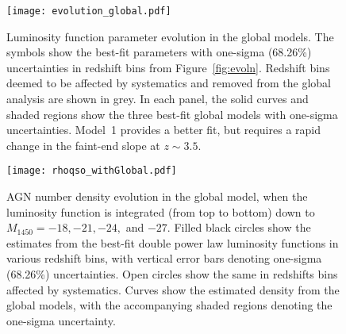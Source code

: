 \documentclass[fleqn,usenatbib]{mnras}
\begin{document}
      \begin{figure*}
        \begin{center}
          \texttt{[image: evolution\_global.pdf]}
        \end{center}
        \caption{Luminosity function parameter evolution in the global
          models.  The symbols show the best-fit parameters with one-sigma
          (68.26\%) uncertainties in redshift bins from
          Figure~\ref{fig:evoln}.  Redshift bins deemed to be affected by
          systematics and removed from the global analysis are shown in
          grey.  In each panel, the solid curves and shaded regions show the
          three best-fit global models with one-sigma uncertainties.
          Model~1 provides a better fit, but requires a rapid change in the
          faint-end slope at $z\sim 3.5$.}
        \label{fig:evoln_global}
      \end{figure*}

      \begin{figure}
        \begin{center}
          \texttt{[image: rhoqso\_withGlobal.pdf]}
        \end{center}
        \caption{AGN number density evolution in the global model, when the
          luminosity function is integrated (from top to bottom) down to
          $M_\mathrm{1450}=-18, -21, -24,$ and $-27$.  Filled black circles
          show the estimates from the best-fit double power law luminosity
          functions in various redshift bins, with vertical error bars
          denoting one-sigma (68.26\%) uncertainties.  Open circles show the
          same in redshifts bins affected by systematics.  Curves show the
          estimated density from the global models, with the accompanying
          shaded regions denoting the one-sigma uncertainty. }
        \label{fig:rhoqso}
      \end{figure}
\end{document}
